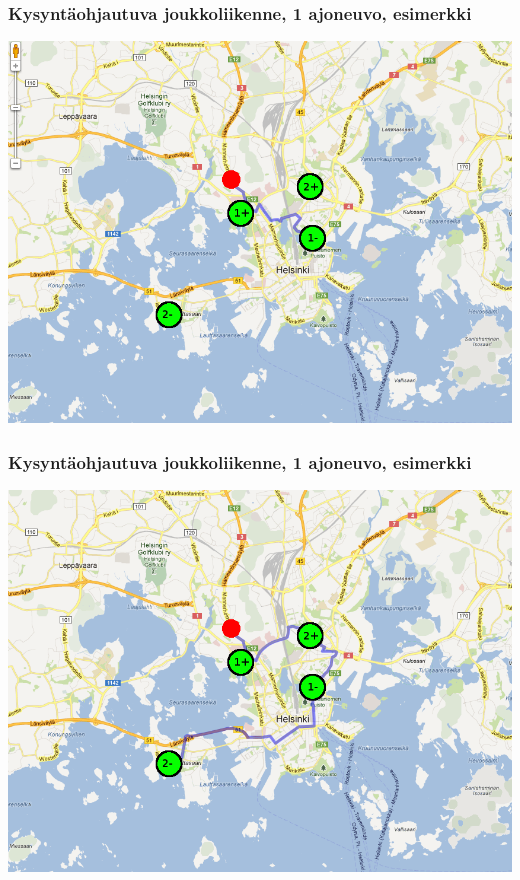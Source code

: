 \documentclass{beamer}
\begin{document}
            \begin{frame}
  \frametitle{Kysyntäohjautuva joukkoliikenne, 1 ajoneuvo, esimerkki}   %
\begin{center}
\includegraphics[scale=0.3]{ekademo05}
\end{center}
    \end{frame}
    
            \begin{frame}
  \frametitle{Kysyntäohjautuva joukkoliikenne, 1 ajoneuvo, esimerkki}   %
\begin{center}
\includegraphics[scale=0.3]{ekademo06}
\end{center}
    \end{frame}
\end{document}
